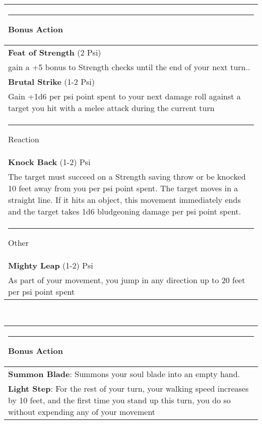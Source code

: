 \documentclass[twocolumn]{article}
\begin{document}
\\
\noindent\begin{tabular}{|m{3.1in}|}
\hline
\rule{1.25in}{0pt}Bonus Action\\
\hline
\textbf{Feat of Strength} (2 Psi)\\
gain	a	+5	bonus	to	Strength	checks	until	the	
end	of your	next	turn..\\
\textbf{Brutal Strike} (1-2 Psi)\\
Gain	+1d6 per psi point spent	to	your	next	damage	roll	against	a	
target	you	hit	with	a	melee	attack	during	the	
current	turn\\
\hline
\rule{1.1in}{0pt}Reaction\\
\hline
\textbf{Knock Back} (1-2) Psi\\
The	target	must	succeed	on	a	
Strength	saving	throw	or	be	knocked	10	feet	
away	from	you	per	psi	point	spent.	The	target	
moves	in	a	straight	line.	If	it	hits	an	object,	this	
movement	immediately	ends	and	the	target	
takes	1d6	bludgeoning	damage	per	psi	point	
spent.\\
\hline
\rule{1.1in}{0pt}Other\\
\hline
\textbf{Mighty Leap} (1-2) Psi\\
As	part	of	your	
movement,	you	jump	in	any	direction	up	to	20	
feet	per	psi	point	spent \\
\hline
\end{tabular}
\vspace{8pt}

\\
\noindent\begin{tabular}{|m{3.1in}|}
\hline
\rule{1.25in}{0pt}Bonus Action\\
\hline
\textbf{Summon Blade}: Summons your soul blade into an empty hand. \\
\hline
\textbf{Light Step}: For	the	rest	of	
your	turn,	your	walking	speed	increases	by	10	
feet,	and	the	first	time	you	stand	up this	turn,
you	do	so	without	expending	any	of	your	
movement\\
\hline
\end{tabular}
\vspace{8pt}
\end{document}
